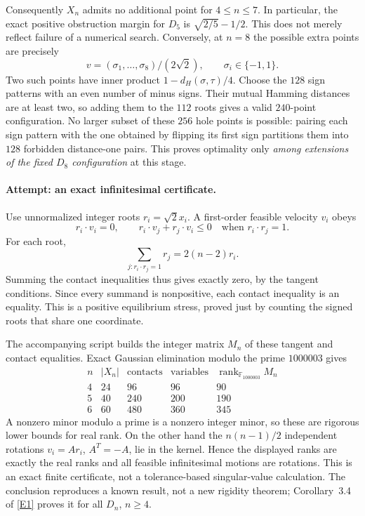 \documentclass[11pt,a4paper]{article}
\newcommand{\F}{\mathbb{F}}
\newcommand{\eref}[2]{\hyperlink{extra:#1:#2}{[E#2]}}
\numberwithin{equation}{section}
\begin{document}
Consequently $X_n$ admits no additional point for $4\leq n\leq7$.
In particular, the exact positive obstruction margin for $D_5$ is
$\sqrt{2/5}-1/2$. This does not merely reflect failure of a numerical
search. Conversely, at $n=8$ the possible extra points are precisely
\[
 v=(\sigma_1,\ldots,\sigma_8)/(2\sqrt2),
 \qquad \sigma_i\in\{-1,1\}.
\]
Two such points have inner product $1-d_H(\sigma,\tau)/4$.
Choose the $128$ sign patterns with an even number of minus signs.
Their mutual Hamming distances are at least two, so adding them to the
$112$ roots gives a valid $240$-point configuration. No larger subset of
these $256$ hole points is possible: pairing each sign pattern with the
one obtained by flipping its first sign partitions them into $128$
forbidden distance-one pairs. This proves optimality only \emph{among
extensions of the fixed $D_8$ configuration} at this stage.

\paragraph{Attempt: an exact infinitesimal certificate.}
Use unnormalized integer roots $r_i=\sqrt2x_i$. A first-order feasible
velocity $v_i$ obeys
\[
 r_i\cdot v_i=0,\qquad
 r_i\cdot v_j+r_j\cdot v_i\leq0
             \quad\text{when }r_i\cdot r_j=1.
\]
For each root,
\[
 \sum_{j:r_i\cdot r_j=1}r_j=2(n-2)r_i.
\]
Summing the contact inequalities thus gives exactly zero, by the tangent
conditions. Since every summand is nonpositive, each contact inequality
is an equality. This is a positive equilibrium stress, proved just by
counting the signed roots that share one coordinate.

The accompanying script builds the integer matrix $M_n$ of these tangent
and contact equalities. Exact Gaussian elimination modulo the prime
$1000003$ gives
\[
 \begin{array}{c|r|r|r|r}
 n&|X_n|&\text{contacts}&\text{variables}&\operatorname{rank}_{\F_{1000003}}M_n\\\hline
 4&24&96&96&90\\
 5&40&240&200&190\\
 6&60&480&360&345
 \end{array}
\]
A nonzero minor modulo a prime is a nonzero integer minor, so these are
rigorous lower bounds for real rank. On the other hand the
$n(n-1)/2$ independent rotations $v_i=Ar_i$, $A^T=-A$, lie in the
kernel. Hence the displayed ranks are exactly the real ranks and all
feasible infinitesimal motions are rotations. This is an exact finite
certificate, not a tolerance-based singular-value calculation. The
conclusion reproduces a known result, not a new rigidity theorem;
Corollary~3.4 of \eref{110}{1} proves it for all $D_n$, $n\geq4$.
\end{document}
